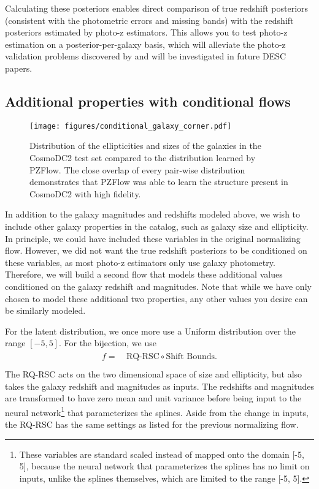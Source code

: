 \documentclass[twocolumn]{aastex631}
\begin{document}
Calculating these posteriors enables direct comparison of true redshift posteriors (consistent with the photometric errors and missing bands) with the redshift posteriors estimated by photo-z estimators.
This allows you to test photo-z estimation on a posterior-per-galaxy basis, which will alleviate the photo-z validation problems discovered by \citet{schmidt2020} and will be investigated in future DESC papers.


\subsection{Additional properties with conditional flows}
\label{sec:fwd-model-condtional}

\begin{figure*}[t!]
    \begin{centering}
        \texttt{[image: figures/conditional\_galaxy\_corner.pdf]}
        \caption{
            Distribution of the ellipticities and sizes of the galaxies in the CosmoDC2 test set compared to the distribution learned by PZFlow.
            The close overlap of every pair-wise distribution demonstrates that PZFlow was able to learn the structure present in CosmoDC2 with high fidelity.
        }
        \label{fig:conditional-corner}
    \end{centering}
\end{figure*}

In addition to the galaxy magnitudes and redshifts modeled above, we wish to include other galaxy properties in the catalog, such as galaxy size and ellipticity.
In principle, we could have included these variables in the original normalizing flow.
However, we did not want the true redshift posteriors to be conditioned on these variables, as most photo-z estimators only use galaxy photometry.
Therefore, we will build a second flow that models these additional values conditioned on the galaxy redshift and magnitudes.
Note that while we have only chosen to model these additional two properties, any other values you desire can be similarly modeled.

For the latent distribution, we once more use a Uniform distribution over the range $[-5, 5]$.
For the bijection, we use
\begin{align}
    \begin{split}
        f =& ~ \text{RQ-RSC} \circ \text{Shift Bounds}. \\
    \end{split}
\end{align}
The RQ-RSC acts on the two dimensional space of size and ellipticity, but also takes the galaxy redshift and magnitudes as inputs.
The redshifts and magnitudes are transformed to have zero mean and unit variance before being input to the neural network\footnote{These variables are standard scaled instead of mapped onto the domain [-5, 5], because the neural network that parameterizes the splines has no limit on inputs, unlike the splines themselves, which are limited to the range [-5, 5].} that parameterizes the splines.
Aside from the change in inputs, the RQ-RSC has the same settings as listed for the previous normalizing flow.
\end{document}
